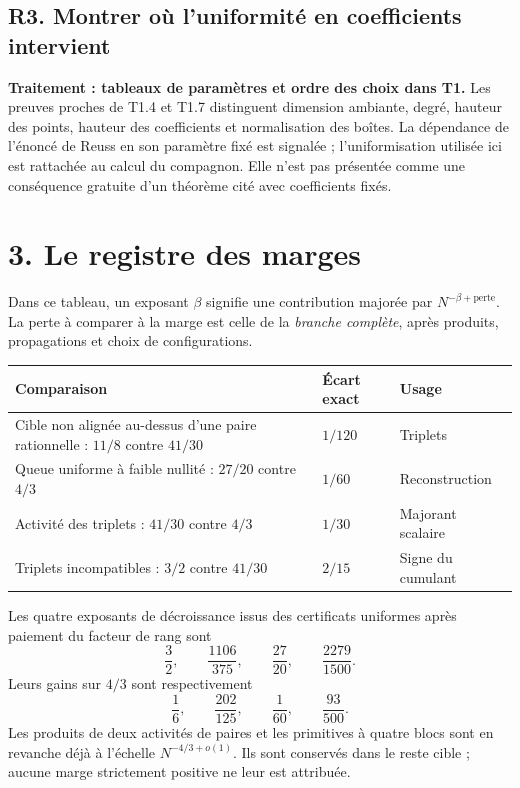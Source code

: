 \documentclass[11pt,a4paper]{article}
\begin{document}
\subsection*{R3. Montrer où l'uniformité en coefficients intervient}
\textbf{Traitement : tableaux de paramètres et ordre des choix dans T1.}
Les preuves proches de T1.4 et T1.7 distinguent dimension ambiante,
degré, hauteur des points, hauteur des coefficients et normalisation
des boîtes. La dépendance de l'énoncé de Reuss en son paramètre fixé
est signalée ; l'uniformisation utilisée ici est rattachée au calcul
du compagnon. Elle n'est pas présentée comme une conséquence gratuite
d'un théorème cité avec coefficients fixés.

\clearpage
\section*{3. Le registre des marges}
Dans ce tableau, un exposant \(\beta\) signifie une contribution
majorée par \(N^{-\beta+\text{perte}}\). La perte à comparer à la marge
est celle de la \emph{branche complète}, après produits, propagations
et choix de configurations.

\small
\begin{tabularx}{\textwidth}{@{}>{\raggedright\arraybackslash}X>{\centering\arraybackslash}p{}>{\centering\arraybackslash}p{}@{}}
\toprule
Comparaison & Écart exact & Usage\\
\midrule
Cible non alignée au-dessus d'une paire rationnelle :
\(11/8\) contre \(41/30\)
& \(1/120\) & Triplets\\[5pt]
Queue uniforme à faible nullité :
\(27/20\) contre \(4/3\)
& \(1/60\) & Reconstruction\\[5pt]
Activité des triplets :
\(41/30\) contre \(4/3\)
& \(1/30\) & Majorant scalaire\\[5pt]
Triplets incompatibles :
\(3/2\) contre \(41/30\)
& \(2/15\) & Signe du cumulant\\
\bottomrule
\end{tabularx}
\normalsize

Les quatre exposants de décroissance issus des certificats uniformes
après paiement du facteur de rang sont
\[
 \frac32,\qquad \frac{1106}{375},\qquad
 \frac{27}{20},\qquad \frac{2279}{1500}.
\]
Leurs gains sur \(4/3\) sont respectivement
\[
 \frac16,\qquad \frac{202}{125},\qquad
 \frac1{60},\qquad \frac{93}{500}.
\]
Les produits de deux activités de paires et les primitives à quatre
blocs sont en revanche déjà à l'échelle \(N^{-4/3+o(1)}\).
Ils sont conservés dans le reste cible ; aucune marge strictement
positive ne leur est attribuée.
\end{document}
